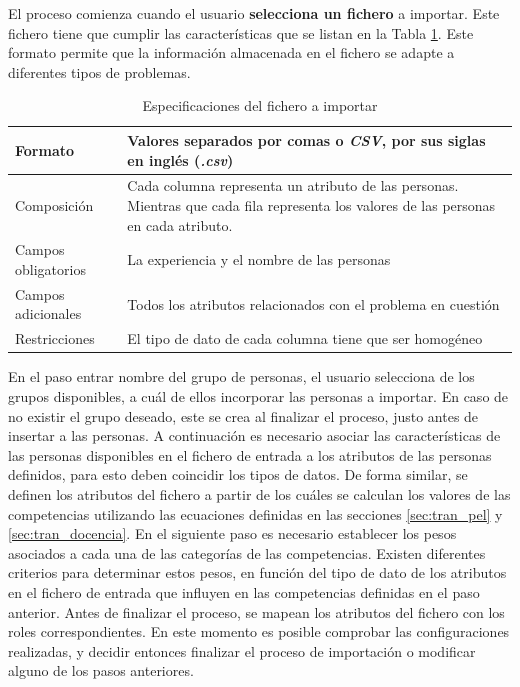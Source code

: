 El proceso comienza cuando el usuario \textbf{selecciona un fichero} a importar. Este fichero tiene que cumplir las características que se listan en la Tabla \ref{table:especificaciones-fichero}. Este formato permite que la información almacenada en el fichero se adapte a diferentes tipos de problemas.

\begin{table}[H]
	\centering
	\caption{Especificaciones del fichero a importar}\label{table:especificaciones-fichero}
	\begin{tabular} {l | p{10cm}}
		\toprule
		Formato & Valores separados por comas o \textit{CSV}, por sus siglas en inglés (\textit{.csv}) \\ \midrule
		Composición & Cada columna representa un atributo de las personas. Mientras que cada fila representa los valores de las personas en cada atributo. \\ \hline
		Campos obligatorios & La experiencia y el nombre de las personas \\ \hline
		Campos adicionales & Todos los atributos relacionados con el problema en cuestión \\ \hline 
		Restricciones & El tipo de dato de cada columna tiene que ser homogéneo \\ \bottomrule
	\end{tabular}
\end{table}

En el paso entrar nombre del grupo de personas, el usuario selecciona de los grupos disponibles, a cuál de ellos incorporar las personas a importar. En caso de no existir el grupo deseado, este se crea al finalizar el proceso, justo antes de insertar a las personas. A continuación es necesario asociar las características de las personas disponibles en el fichero de entrada a los atributos de las personas definidos, para esto deben coincidir los tipos de datos. De forma similar, se definen los atributos del fichero a partir de los cuáles se calculan los valores de las competencias utilizando las ecuaciones definidas en las secciones \ref{sec:tran_pel} y \ref{sec:tran_docencia}. En el siguiente paso es necesario establecer los pesos asociados a cada una de las categorías de las competencias. Existen diferentes criterios para determinar estos pesos, en función del tipo de dato de los atributos en el fichero de entrada que influyen en las competencias definidas en el paso anterior. Antes de finalizar el proceso, se mapean los atributos del fichero con los roles correspondientes. En este momento es posible comprobar las configuraciones realizadas, y decidir entonces finalizar el proceso de importación o modificar alguno de los pasos anteriores. \\

